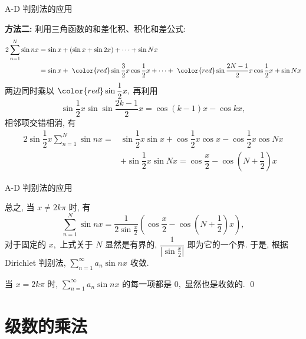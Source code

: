 
\begin{frame}{A-D 判别法的应用}

\textbf{方法二:} 利用三角函数的和差化积、积化和差公式:
{
\begin{align*}
2\sum\limits_{n=1}^N \sin nx & = \sin x + \left( \sin x + \sin 2x \right) + \cdots + \sin Nx \\
& = \sin x + ~ {\color{red} \sin \dfrac{3}{2}x} \cos \dfrac{1}{2}x + \cdots + ~ {\color{red} \sin \dfrac{2N-1}{2}x} \cos \dfrac{1}{2}x + \sin Nx
\end{align*}
}
\pause
两边同时乘以 ${\color{red} \sin \dfrac{1}{2}x},$ 再利用
\[\sin \dfrac{1}{2}x \sin \sin \dfrac{2k-1}{2}x = \cos (k-1)x - \cos kx,\]
相邻项交错相消, 有
{
\begin{align*}
2\sin \dfrac{1}{2}x\sum\limits_{n=1}^N \sin nx
= & \sin \dfrac{1}{2}x \sin x + \cos \dfrac{1}{2}x \cos x - \cos \dfrac{1}{2}x \cos Nx \\
& + \sin \dfrac{1}{2}x \sin Nx
= \cos\dfrac{x}{2} - \cos \left(N + \dfrac{1}{2}\right) x
\end{align*}
}

\end{frame}


\begin{frame}{A-D 判别法的应用}

总之, 当 $x \neq 2k\pi$ 时, 有
\[\sum\limits_{n=1}^N \sin nx = \dfrac{1}{2\sin\frac{x}{2}} \left( \cos\dfrac{x}{2} - \cos \left(N + \dfrac{1}{2}\right) x \right),\]
对于固定的 $x,$ 上式关于 $N$ 显然是有界的, $\dfrac{1}{\left\lvert \sin\frac{x}{2} \right\rvert}$ 即为它的一个界. 于是, 根据 Dirichlet 判别法, $\sum\limits_{n=1}^\infty a_n \sin nx$ 收敛.

\pause
\vspace{0.6em}

当 $x = 2k\pi$ 时, $\sum\limits_{n=1}^\infty a_n \sin nx$ 的每一项都是 $0,$ 显然也是收敛的.
\qed

\end{frame}


\section{级数的乘法}  %

